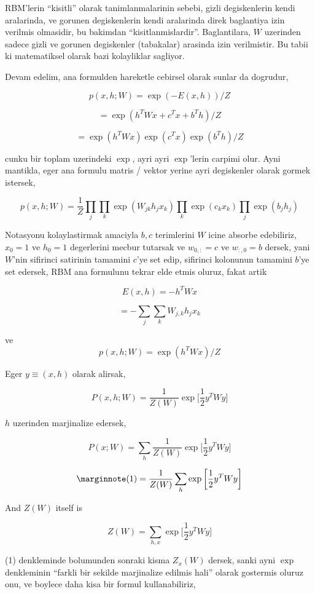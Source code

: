 \documentclass[12pt,fleqn]{article}\usepackage{../common}
\begin{document}
RBM'lerin ``kisitli'' olarak tanimlanmalarinin sebebi, gizli degiskenlerin
kendi aralarinda, ve gorunen degiskenlerin kendi aralarinda direk
baglantiya izin verilmis olmasidir, bu bakimdan
``kisitlanmislardir''. Baglantilara, $W$ uzerinden sadece gizli ve gorunen
degiskenler (tabakalar) arasinda izin verilmistir. Bu tabii ki matematiksel
olarak bazi kolayliklar sagliyor.

Devam edelim, ana formulden hareketle cebirsel olarak sunlar da dogrudur,

$$ p(x,h;W) = \exp (-E(x,h)) / Z $$

$$ = \exp (h^TWx + c^Tx + b^Th ) / Z $$

$$ = \exp (h^TWx) \exp (c^Tx) \exp(b^Th) / Z $$

cunku bir toplam uzerindeki $\exp$, ayri ayri $\exp$'lerin carpimi
olur. Ayni mantikla, eger ana formulu matris / vektor yerine ayri
degiskenler olarak gormek istersek,

$$ 
p(x,h;W) = \frac{1}{Z}
\prod_j \prod_k \exp (W_{jk}h_jx_k) \prod_k \exp(c_kx_k) \prod_j \exp(b_jh_j) 
 $$

Notasyonu kolaylastirmak amaciyla $b,c$ terimlerini $W$ icine absorbe
edebiliriz, $x_0=1$ ve $h_0=1$ degerlerini mecbur tutarsak ve $w_{0,:}=c$
ve $w_{:,0}=b$ dersek, yani $W$'nin sifirinci satirinin tamamini $c$'ye set
edip, sifirinci kolonunun tamamini $b$'ye set edersek, RBM ana formulunu
tekrar elde etmis oluruz, fakat artik 

$$ E(x,h) = -h^TWx $$


$$ = - \sum_j \sum_k W_{j,k}h_jx_k  $$

ve
$$ p(x,h;W)  = \exp (h^TWx) / Z $$


Eger $y \equiv (x,h)$ olarak alirsak, 


$$ P(x,h;W) = \frac{1}{Z(W)} \exp 
\bigg[ 
\frac{1}{2} y^T W y
\bigg]
$$

$h$ uzerinden marjinalize edersek,

$$ P(x;W) = \sum_h \frac{1}{Z(W)} \exp 
\bigg[ 
\frac{1}{2} y^T W y
\bigg]
$$


$$  
\mlabel{1}
= \frac{1}{Z(W)}  \sum_h \exp 
\bigg[ 
\frac{1}{2} y^T W y
\bigg]
$$


And $Z(W)$ itself is

$$ Z(W) = \sum_{h,x} \exp 
\bigg[ 
\frac{1}{2} y^T W y
\bigg]
$$

(1) denkleminde bolumunden sonraki kisma $Z_x(W)$ dersek, sanki ayni $\exp$
denkleminin ``farkli bir sekilde marjinalize edilmis hali'' olarak
gostermis oluruz onu, ve boylece daha kisa bir formul kullanabiliriz,
\end{document}
